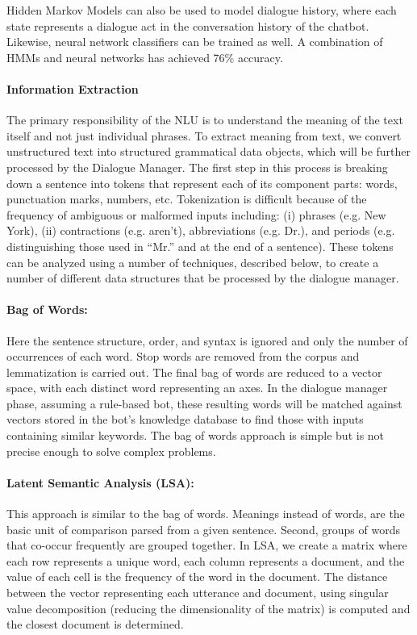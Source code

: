 Hidden Markov Models can also be used to model dialogue history, where each
state represents a dialogue act in the conversation history of the chatbot.
Likewise, neural network classifiers can be trained as well. A combination of
HMMs and neural networks has achieved 76\% accuracy.

\paragraph{Information Extraction}

The primary responsibility of the NLU is to understand the meaning of the text
itself and not just individual phrases. To extract meaning from text, we convert
unstructured text  into structured grammatical data objects, which will be
further processed by the Dialogue Manager. The first step in this process is
breaking down a sentence into tokens that represent each of its component parts:
words, punctuation marks, numbers, etc. Tokenization is difficult because of the
frequency of ambiguous or malformed inputs including: (i) phrases (e.g. New
York), (ii) contractions (e.g. aren’t), abbreviations (e.g. Dr.), and periods
(e.g. distinguishing those used in “Mr.” and at the end of a sentence). These
tokens can be analyzed using a number of techniques, described below, to create
a number of different data structures that be processed by the dialogue manager.

\paragraph*{Bag of Words:}

Here the sentence structure, order, and syntax is ignored and only the number of
occurrences of each word. Stop words are removed from the corpus and
lemmatization is carried out. The final bag of words are reduced to a vector
space, with each distinct word representing an axes. In the dialogue manager
phase, assuming a rule-based bot, these resulting words will be matched against
vectors stored in the bot’s knowledge database to find those with inputs
containing similar keywords. The bag of words approach is simple but is not
precise enough to solve complex problems.

\paragraph*{Latent Semantic Analysis (LSA):}

This approach is similar to the bag of words. Meanings instead of words, are the
basic unit of comparison parsed from a given sentence. Second, groups of words
that co-occur frequently are grouped together. In LSA, we create a matrix where
each row represents a unique word, each column represents a document, and the
value of each cell is the frequency of the word in the document. The distance
between the vector representing each utterance and document, using singular
value decomposition (reducing the dimensionality of the matrix) is computed and
the closest document is determined. 

